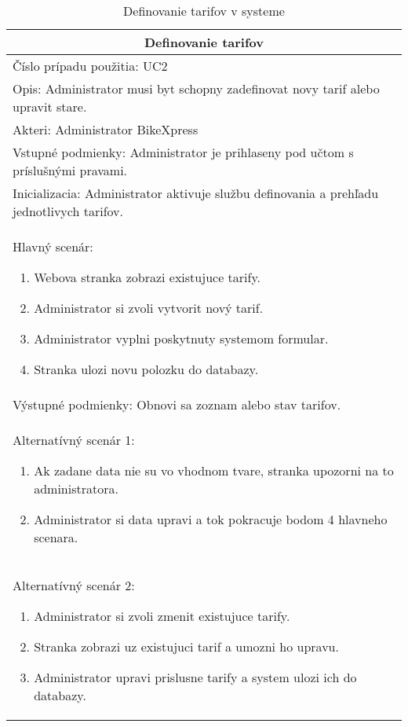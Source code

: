 \begin{table}[h]
  \centering
  \begin{tabular}{|p{12cm}|}
   \hline
   \multicolumn{1}{|c|}{ \textbf{Definovanie tarifov}} \\
   \hline
   Číslo prípadu použitia: UC2\\
   \hline
   Opis: Administrator musi byt schopny zadefinovat novy tarif alebo upravit stare.\\
   \hline
   Akteri: Administrator BikeXpress\\
   \hline
   Vstupné podmienky: Administrator je prihlaseny pod učtom s príslušnými pravami.\\
   \hline
   Inicializacia: Administrator aktivuje službu definovania a prehľadu jednotlivych tarifov.\\
   \hline
   Hlavný scenár:
   \begin{enumerate} 
       \item Webova stranka zobrazi existujuce tarify.
       \item Administrator si zvoli vytvorit nový tarif. 
       \item Administrator vyplni poskytnuty systemom formular.
       \item Stranka ulozi novu polozku do databazy.
   \end{enumerate}\\
   \hline
   Výstupné podmienky: Obnovi sa zoznam alebo stav tarifov.\\
   \hline
   Alternatívný scenár 1:
   \begin{enumerate} 
       \item Ak zadane data nie su vo vhodnom tvare, stranka upozorni na to administratora.
       \item Administrator si data upravi a tok pokracuje bodom 4 hlavneho scenara.
   \end{enumerate}\\
   \hline
   Alternatívný scenár 2:
   \begin{enumerate} 
       \item Administrator si zvoli zmenit existujuce tarify.
       \item Stranka zobrazi uz existujuci tarif a umozni ho upravu.
       \item Administrator upravi prislusne tarify a system ulozi ich do databazy.
   \end{enumerate}\\
   \hline
  \end{tabular}
  \caption{Definovanie tarifov v systeme}
  \label{tab:use_case_steps}
\end{table}

